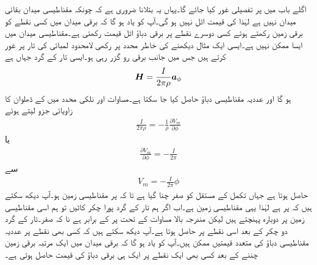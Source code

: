 اگلے باب میں  پر تفصیلی غور کیا جائے گا۔یہاں یہ بتلانا ضروری ہے کہ چونکہ مقناطیسی میدان  بقائی میدان نہیں ہے لہٰذا  کی قیمت اٹل نہیں ہو گی۔آپ کو یاد ہو گا کہ برقی میدان میں کسی نقطے کو برقی زمین رکھتے ہوئے کسی دوسرے نقطے پر برقی دباؤ اٹل قیمت رکھتی ہے۔مقناطیسی میدان میں ایسا ممکن نہیں ہے۔ایسی ایک مثال دیکھنے کی خاطر  محدد پر رکھی لامحدود لمبائی کی تار پر غور کرتے ہیں جس میں  جانب  برقی رو گزر رہی ہو۔ایسی تار کے گرد جہاں  ہے
\begin{align*}
{\ensuremath{{\boldsymbol{H}}}}=\frac{I}{2\pi \rho} {\boldsymbol{a}}_{\phi}
\end{align*}
ہو گا اور عددیہ مقناطیسی دباؤ حاصل کیا جا سکتا ہے۔مساوات  اور نلکی محدد میں  کے ڈھلوان کا زاویائی جزو لیتے ہوئے
\begin{align*}
\frac{I}{2\pi \rho} =-\frac{1}{\rho} \frac{\partial V_m}{\partial \phi}
\end{align*}
یا
\begin{align*}
\frac{\partial V_m}{\partial \phi}=-\frac{I}{2\pi}
\end{align*}
سے
\begin{align*}
V_m=-\frac{I}{2\pi}\phi
\end{align*}
حاصل ہوتا ہے جہاں تکمل کے مستقل کو صفر چنا گیا ہے تا کہ  پر مقناطیسی زمین ہو۔آپ دیکھ سکتے ہیں کہ  پر  ہے لہٰذا یہی مقناطیسی زمین ہے۔اب اگر ہم تار کے گرد پورا چکر کاٹیں تو ہم اسی مقناطیسی زمین پر دوبارہ پہنچتے ہیں لیکن مندرجہ بالا مساوات کے تحت  پر  کے برابر ہے نا کہ صفر۔تار کے گرد دو چکر کے بعد اسی نقطے پر  حاصل ہوتا ہے۔آپ دیکھ سکتے ہیں کہ کسی بھی نقطے پر عددیہ مقناطیسی دباؤ کی متعدد قیمتیں ممکن ہیں۔آپ کو یاد ہو گا کہ برقی میدان میں ایک مرتبہ برقی زمین چننے کے بعد کسی بھی ایک نقطے پر ایک ہی برقی دباؤ کی قیمت حاصل ہوتی ہے۔

